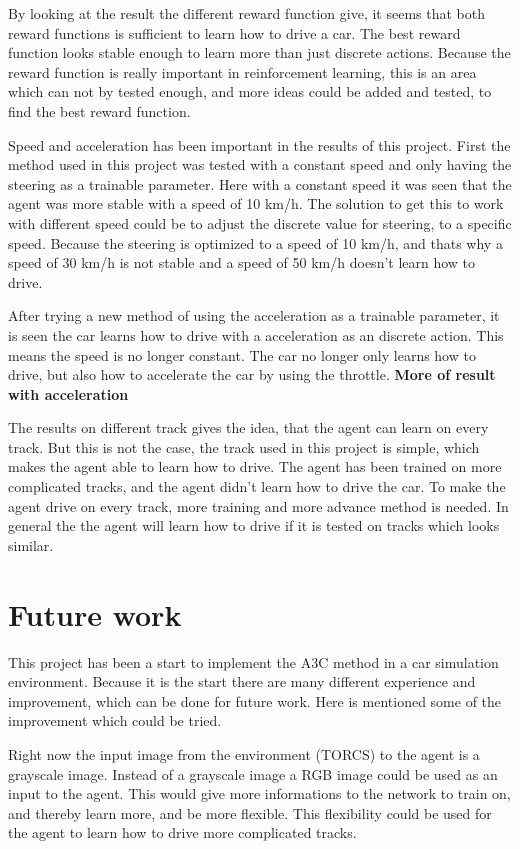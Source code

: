 By looking at the result the different reward function give, it seems that both reward functions is sufficient to learn how to drive a car. The best reward function looks stable enough to learn more than just discrete actions. Because the reward function is really important in reinforcement learning, this is an area which can not by tested enough, and more ideas could be added and tested, to find the best reward function.

Speed and acceleration has been important in the results of this project. First the method used in this project was tested with a constant speed and only having the steering as a trainable parameter. Here with a constant speed it was seen that the agent was more stable with a speed of 10 km/h. The solution to get this to work with different speed could be to adjust the discrete value for steering, to a specific speed. Because the steering is optimized to a speed of 10 km/h, and thats why a speed of 30 km/h is not stable and a speed of 50 km/h doesn't learn how to drive. 

After trying a new method of using the acceleration as a trainable parameter, it is seen the car learns how to drive with a acceleration as an discrete action. This means the speed is no longer constant. The car no longer only learns how to drive, but also how to accelerate the car by using the throttle. \textbf{More of result with acceleration} 

The results on different track gives the idea, that the agent can learn on every track. But this is not the case, the track used in this project is simple, which makes the agent able to learn how to drive. The agent has been trained on more complicated tracks, and the agent didn't learn how to drive the car. To make the agent drive on every track, more training and more advance method is needed. In general the the agent will learn how to drive if it is tested on tracks which looks similar. 
 
\section{Future work}
This project has been a start to implement the A3C method in a car simulation environment. Because it is the start there are many different experience and improvement, which can be done for future work. Here is mentioned some of the improvement which could be tried. 

Right now the input image from the environment (TORCS) to the agent is a grayscale image. Instead of a grayscale image a RGB image could be used as an input to the agent. This would give more informations to the network to train on, and thereby learn more, and be more flexible. This flexibility could be used for the agent to learn how to drive more complicated tracks. 


